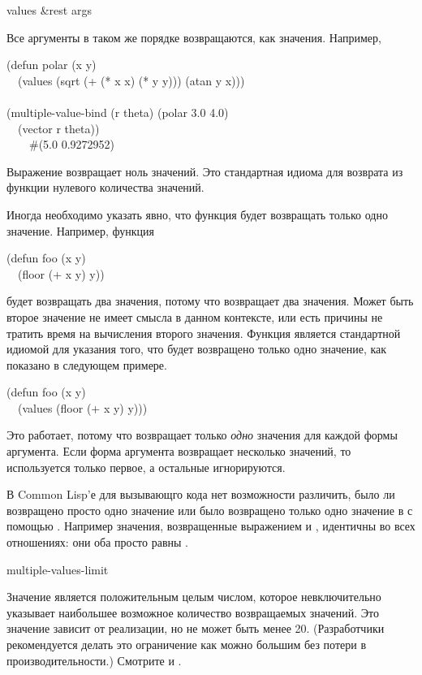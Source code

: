 \begin{defun}[Function]
values &rest args

Все аргументы в таком же порядке возвращаются, как значения.
Например,
\begin{lisp}
(defun polar (x y) \\
~~(values (sqrt (+ (* x x) (* y y))) (atan y x))) \\
 \\
(multiple-value-bind (r theta) (polar 3.0 4.0) \\
~~(vector r theta)) \\
~~~\EV\ \#(5.0 0.9272952)
\end{lisp}

Выражение  возвращает ноль значений. Это стандартная идиома для
возврата из функции нулевого количества значений.

Иногда необходимо указать явно, что функция будет возвращать только одно
значение. Например, функция
\begin{lisp}
(defun foo (x y) \\
~~(floor (+ x y) y))
\end{lisp}
будет возвращать два значения, потому что  возвращает два
значения. Может быть второе значение не имеет смысла в данном контексте, или
есть причины не тратить время на вычисления второго значения. Функция
 является стандартной идиомой для указания того, что будет
возвращено только одно значение, как показано в следующем примере.
\begin{lisp}
(defun foo (x y) \\
~~(values (floor (+ x y) y)))
\end{lisp}
Это работает, потому что  возвращает только \emph{одно} значения для
каждой формы аргумента. Если форма аргумента возвращает несколько значений, то
используется только первое, а остальные игнорируются.

В Common Lisp'е для вызывающго кода нет возможности различить, было ли
возвращено просто одно значение или было возвращено только одно значение в с
помощью . Например значения, возвращенные выражением  и 
, идентичны во всех отношениях: они оба просто равны .
\end{defun}

\begin{defun}[Constant]
multiple-values-limit

Значение  является положительным целым числом,
которое невключительно указывает наибольшее возможное количество возвращаемых
значений. Это значение зависит от реализации, но не может быть менее 20.
(Разработчики рекомендуется делать это ограничение как можно большим без потери
в производительности.)
Смотрите  и .
\end{defun}

